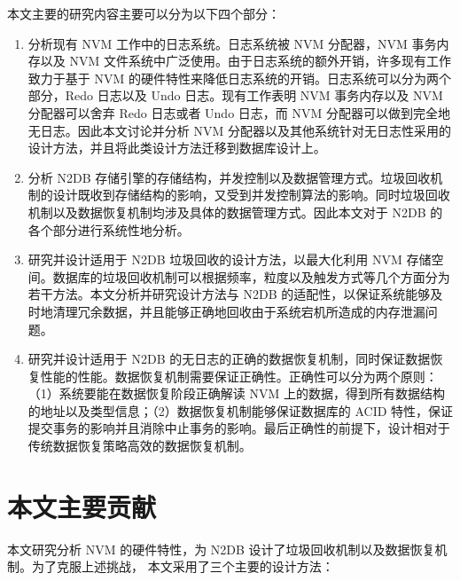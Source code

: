 本文主要的研究内容主要可以分为以下四个部分：
\begin{enumerate}
    \item 分析现有 NVM 工作中的日志系统。日志系统被 NVM 分配器，NVM 事务内存以及 NVM 文件系统中广泛使用。由于日志系统的额外开销，许多现有工作致力于基于 NVM 的硬件特性来降低日志系统的开销。日志系统可以分为两个部分，Redo 日志以及 Undo 日志。现有工作表明 NVM 事务内存以及 NVM 分配器可以舍弃 Redo 日志或者 Undo 日志，而 NVM 分配器可以做到完全地无日志。因此本文讨论并分析 NVM 分配器以及其他系统针对无日志性采用的设计方法，并且将此类设计方法迁移到数据库设计上。
    \item 分析 N2DB 存储引擎的存储结构，并发控制以及数据管理方式。垃圾回收机制的设计既收到存储结构的影响，又受到并发控制算法的影响。同时垃圾回收机制以及数据恢复机制均涉及具体的数据管理方式。因此本文对于 N2DB 的各个部分进行系统性地分析。
    \item 研究并设计适用于 N2DB 垃圾回收的设计方法，以最大化利用 NVM 存储空间。数据库的垃圾回收机制可以根据频率，粒度以及触发方式等几个方面分为若干方法。本文分析并研究设计方法与 N2DB 的适配性，以保证系统能够及时地清理冗余数据，并且能够正确地回收由于系统宕机所造成的内存泄漏问题。
    \item 研究并设计适用于 N2DB 的无日志的正确的数据恢复机制，同时保证数据恢复性能的性能。数据恢复机制需要保证正确性。正确性可以分为两个原则：（1）系统要能在数据恢复阶段正确解读 NVM 上的数据，得到所有数据结构的地址以及类型信息；（2）数据恢复机制能够保证数据库的 ACID 特性，保证提交事务的影响并且消除中止事务的影响。最后正确性的前提下，设计相对于传统数据恢复策略高效的数据恢复机制。
\end{enumerate}

\section{本文主要贡献}

本文研究分析 NVM 的硬件特性，为 N2DB 设计了垃圾回收机制以及数据恢复机制。为了克服上述挑战， 本文采用了三个主要的设计方法：


